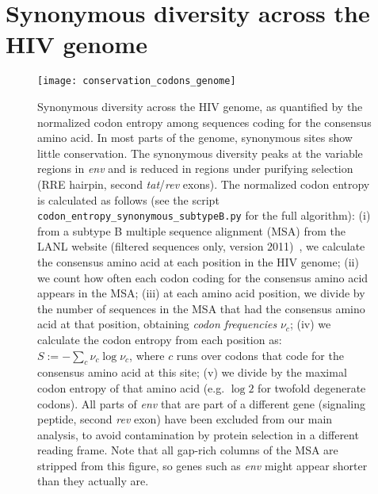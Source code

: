 \section{Synonymous diversity across the HIV genome}
\begin{figure}[h]
\begin{center}
\texttt{[image: conservation\_codons\_genome]}
\caption{
Synonymous diversity across the HIV genome, as quantified by the normalized
codon entropy among sequences coding for the consensus amino acid. In most
parts of the genome, synonymous sites show little conservation. The synonymous
diversity peaks at the variable regions in {\it env} and is reduced in regions 
under purifying selection (RRE hairpin, second {\it tat}/{\it rev} exons). The
normalized codon entropy is calculated as follows (see the script
\texttt{codon\_entropy\_synonymous\_subtypeB.py} for the full algorithm): (i)
from a subtype B multiple sequence alignment (MSA) from the LANL website (filtered sequences only, version 2011)~\cite{LANL2012}, we calculate the
consensus amino acid at each position in the HIV genome; (ii) we count how often
each codon coding for the consensus amino acid appears in the MSA; (iii) at each
amino acid position, we divide by the number of sequences in the MSA that had
the consensus amino acid at that position, obtaining {\it codon frequencies}
$\nu_c$; (iv) we calculate the codon entropy from each position as: $S := -
\sum_{c} \nu_c \log \nu_c$, where $c$ runs over codons that code for the
consensus amino acid at this site; (v) we divide by the maximal codon entropy of
that amino acid (e.g. $\log 2$ for twofold degenerate codons). All parts of
{\it env} that are part of a different gene (signaling peptide, second {\it rev}
exon) have been excluded from our main analysis, to avoid contamination by
protein selection in a different reading frame.
Note that all gap-rich columns of the MSA are stripped from this figure, so genes such as {\it env} might appear shorter than they actually
are.
}
\label{fig:syndiv_genome}
\end{center}
\end{figure}
\newpage
% 
